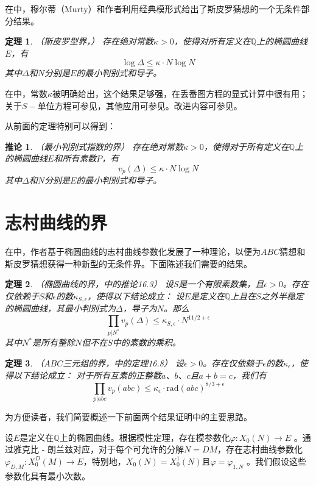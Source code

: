 \documentclass{article}
\newtheorem{theorem}{定理}
\newtheorem{corollary}{推论}
\begin{document}
在\cite{5}中，穆尔蒂（Murty）和作者利用经典模形式给出了斯皮罗猜想的一个无条件部分结果。
\begin{theorem}（斯皮罗型界，\cite{5}）
存在绝对常数\(\kappa>0\)，使得对所有定义在\(\mathbb{Q}\)上的椭圆曲线\(E\)，有
\[\log \Delta \leq \kappa \cdot N \log N\]
其中\(\Delta\)和\(N\)分别是\(E\)的最小判别式和导子。
\end{theorem}
在\cite{5}中，常数\(\kappa\)被明确给出，这个结果足够强，在丢番图方程的显式计算中很有用；关于\(S -\)单位方程可参见\cite{5}，其他应用可参见\cite{15}。改进内容可参见\cite{7}。


从前面的定理特别可以得到：
\setcounter{theorem}{3}
\renewcommand{\thecorollary}{2.\arabic{theorem}}
\begin{corollary}（最小判别式指数的界）
存在绝对常数\(\kappa>0\)，使得对于所有定义在\(\mathbb{Q}\)上的椭圆曲线\(E\)和所有素数\(P\)，有
\[v_{p}(\Delta) \leq \kappa \cdot N \log N\]
其中\(\Delta\)和\(N\)分别是\(E\)的最小判别式和导子。
\end{corollary}

\section{志村曲线的界}

在\cite{7}中，作者基于椭圆曲线的志村曲线参数化发展了一种理论，以便为\(ABC\)猜想和斯皮罗猜想获得一种新型的无条件界。下面陈述我们需要的结果。
\begin{theorem}（椭圆曲线的界，\cite{7}中的推论16.3）
设\(S\)是一个有限素数集，且\(\epsilon>0\)。存在仅依赖于\(S\)和\(\epsilon\)的数\(\kappa_{S,\epsilon}\)，使得以下结论成立：
设\(E\)是定义在\(\mathbb{Q}\)上且在\(S\)之外半稳定的椭圆曲线，其最小判别式为\(\Delta\)，导子为\(N\)。那么
\[\prod_{p | N^{*}} v_{p}(\Delta) \leq \kappa_{S, \epsilon} \cdot N^{11 / 2+\epsilon}\]
其中\(N^{*}\)是所有整除\(N\)但不在\(S\)中的素数的乘积。
\end{theorem}
\begin{theorem}（\(ABC\)三元组的界，\cite{7}中的定理16.8）
设\(\epsilon>0\)。存在仅依赖于\(\epsilon\)的数\(\kappa_{\epsilon}\)，使得以下结论成立：
对于所有互素的正整数\(a\)、\(b\)、\(c\)且\(a + b = c\)，我们有
\[\prod_{p | abc} v_{p}(abc) \leq \kappa_{\epsilon} \cdot \text{rad}(abc)^{8 / 3+\epsilon}\]
\end{theorem}
为方便读者，我们简要概述一下前面两个结果证明中的主要思路。


设\(E\)是定义在\(\mathbb{Q}\)上的椭圆曲线。根据模性定理\cite{1,13,16}，存在模参数化\(\varphi: X_{0}(N) \to E\) 。通过雅克比 - 朗兰兹对应，对于每个可允许的分解\(N = DM\)，存在志村曲线参数化\(\varphi_{D,M}: X_{0}^{D}(M) \to E\)，特别地，\(X_{0}(N)=X_{0}^{1}(N)\)且\(\varphi=\varphi_{1,N}\) 。我们假设这些参数化具有最小次数。
\end{document}
